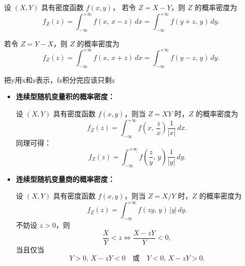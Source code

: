 \begin{proposition}[连续型随机变量差的概率密度]
设 $(X,Y)$ 具有密度函数 $f(x,y)$，  
若令 $Z = X - Y$，则 $Z$ 的概率密度为
\[
f_Z(z)
= \int_{-\infty}^{+\infty} f(x,\, x - z)\,dx
= \int_{-\infty}^{+\infty} f(y + z,\, y)\,dy.
\]

若令 $Z = Y - X$，则 $Z$ 的概率密度为
\[
f_Z(z)
= \int_{-\infty}^{+\infty} f(x,\, x + z)\,dx
= \int_{-\infty}^{+\infty} f(y - z,\, y)\,dy.
\]
\end{proposition}
把y用x和z表示，fz积分完应该只剩z
\begin{itemize}
  \item \textbf{连续型随机变量积的概率密度：}

  设 $(X,Y)$ 具有密度函数 $f(x,y)$，则当 $Z = XY$ 时，$Z$ 的概率密度为
  \[
  f_Z(z)
  = \int_{-\infty}^{+\infty} f\!\left(x,\,\frac{z}{x}\right)\frac{1}{|x|}\,dx.
  \]
  同理可得：
  \[
  f_Z(z)
  = \int_{-\infty}^{+\infty} f\!\left(\frac{z}{y},\,y\right)\frac{1}{|y|}\,dy.
  \]

  \vspace{1em}
  \item \textbf{连续型随机变量商的概率密度：}

  设 $(X,Y)$ 具有密度函数 $f(x,y)$，则当 $Z = X/Y$ 时，$Z$ 的概率密度为
  \[
  f_Z(z)
  = \int_{-\infty}^{+\infty} f(zy,\,y)\,|y|\,dy.
  \]
  不妨设 $z>0$，则
  \[
  \frac{X}{Y}<z \iff \frac{X - zY}{Y} < 0,
  \]
  当且仅当
  \[
  Y>0,\,X-zY<0 \quad \text{或} \quad Y<0,\,X-zY>0.
  \]
\end{itemize}







